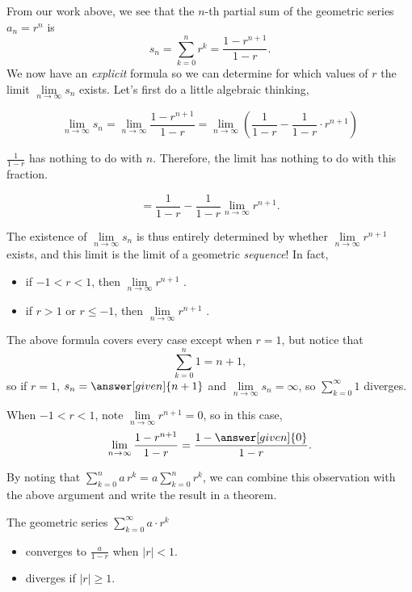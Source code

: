 \documentclass{ximera}
\begin{document}
From our work above, we see that the $n$-th partial sum of the
geometric series $a_n = r^n$ is
\[
s_n = \sum\limits_{k=0}^{n} r^k= \frac{1 - r^{n+1}}{1-r}.
\]
We now have an \emph{explicit} formula so we can determine for which values of $r$ the limit $\lim\limits_{n \to \infty} s_n$ exists.  Let's first do a little algebraic thinking, 

\[
\lim\limits_{n \to \infty} s_n = \lim\limits_{n \to \infty}  \frac{1 - r^{n+1}}{1-r} =   \lim\limits_{n \to \infty}  \left( \frac{1}{1-r} - \frac{1}{1-r} \cdot r^{n+1} \right) 
\]


$\frac{1}{1-r}$ has nothing to do with $n$.  Therefore, the limit has nothing to do with this fraction.


\[
=  \frac{1}{1-r}  - \frac{1}{1-r}  \lim\limits_{n \to \infty} r^{n+1}.
\]





The existence of $\lim\limits_{n \to \infty} s_n $ is thus entirely determined by whether $\lim\limits_{n \to \infty} r^{n+1}$ exists, and this limit is the limit of a geometric \emph{sequence}!  In fact, 

\begin{itemize}
\item if $-1<r<1$, then $\lim\limits_{n \to \infty} r^{n+1}$ . \\
\item if $r>1$ or $r\le -1$, then $\lim\limits_{n \to \infty} r^{n+1}$ .
\end{itemize}

The above formula covers every case except when $r= 1$, but notice that  $$\sum\limits_{k=0}^n 1 = n+1,$$ so if $r=1$, $s_n = \answer[given]{n+1}$ and $\lim\limits_{n \to \infty} s_n = \infty$, so $\sum\limits_{k=0}^{\infty} 1$ diverges. 

When $-1<r<1$, note $\lim\limits_{n \to \infty} r^{n+1}=0$, so in this case,     \[
    \lim\limits_{n\to\infty}\frac{1 - r^{n+1}}{1-r} = \frac{1-\answer[given]{0}}{1-r}.
    \]

By noting that $\sum\limits_{k=0}^n a \, r^k = a \sum\limits_{k=0}^n r^k$, we can combine this observation with the above argument and write the result in a theorem.

\begin{theorem}
  The geometric series $\sum\limits_{k= 0}^\infty a \cdot r^k$ 
  
  \begin{itemize} 
  \item converges to $\frac{a}{1-r}$ when $|r| < 1$.
  \item diverges if $|r| \geq 1$.  
  \end{itemize}
  \end{theorem}
\end{document}
